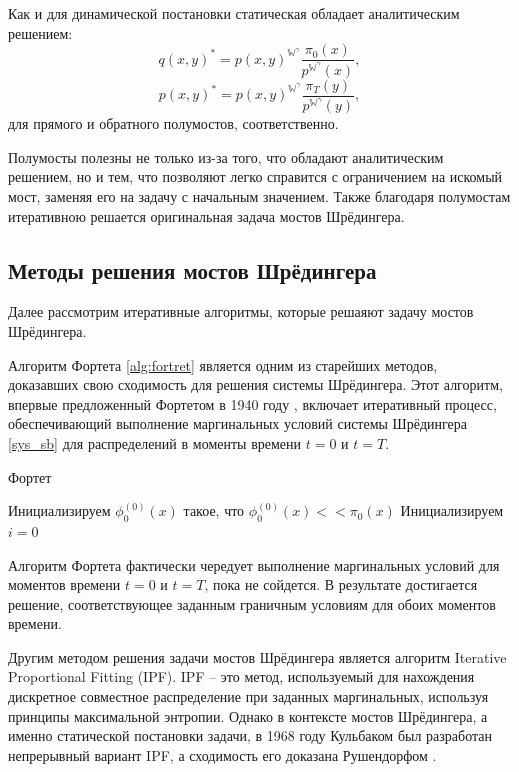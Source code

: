 Как и для динамической постановки статическая обладает аналитическим решением:
\begin{equation*}
    q(x,y)^*=p(x,y)^{\mathbb{W}^\gamma}\frac{\pi_0(x)}{p^{\mathbb{W}^\gamma}(x)},
\end{equation*}
\begin{equation*}
    p(x,y)^*=p(x,y)^{\mathbb{W}^\gamma}\frac{\pi_T(y)}{p^{\mathbb{W}^\gamma}(y)},
\end{equation*}
для прямого и обратного полумостов, соответственно.

Полумосты полезны не только из-за того, что обладают аналитическим решением, но и тем, что позволяют легко справится с ограничением на искомый мост, заменяя его на задачу с начальным значением. Также благодаря полумостам итеративною решается оригинальная задача мостов Шрёдингера.

\subsection{Методы решения мостов Шрёдингера}
Далее рассмотрим итеративные алгоритмы, которые решаяют задачу мостов Шрёдингера.

Алгоритм Фортета \ref{alg:fortret} является одним из старейших методов, доказавших свою сходимость для решения системы Шрёдингера. Этот алгоритм, впервые предложенный Фортетом в 1940 году \cite{fortret}, включает итеративный процесс, обеспечивающий выполнение маргинальных условий системы Шрёдингера \ref{sys_sb} для распределений в моменты времени $t=0$ и $t=T$.

\begin{algorithm}
\caption{Фортет}\label{alg:fortret}
Инициализируем $\phi_0^{(0)}(x)$ такое, что $\phi_0^{(0)}(x)<<\pi_0(x)$\;
Инициализируем $i = 0$\;
\end{algorithm}

Алгоритм Фортета фактически чередует выполнение маргинальных условий для моментов времени $t=0$ и $t=T$, пока не сойдется. В результате достигается решение, соответствующее заданным граничным условиям для обоих моментов времени.

Другим методом решения задачи мостов Шрёдингера является алгоритм Iterative Proportional Fitting (IPF). IPF -- это метод, используемый для нахождения дискретное совместное распределение при заданных маргинальных, используя принципы максимальной энтропии. Однако в контексте мостов Шрёдингера, а именно статической постановки задачи, в 1968 году Кульбаком \cite{kullback} был разработан непрерывный вариант IPF, а сходимость его доказана Рушендорфом \cite{kullback-prove}.

